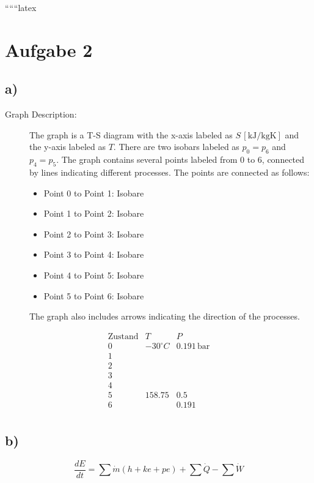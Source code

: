 
``````latex


\section*{Aufgabe 2}

\subsection*{a)}

\begin{description}
    \item[Graph Description:] The graph is a T-S diagram with the x-axis labeled as $S \, [\text{kJ/kgK}]$ and the y-axis labeled as $T$. There are two isobars labeled as $p_0 = p_6$ and $p_4 = p_5$. The graph contains several points labeled from 0 to 6, connected by lines indicating different processes. The points are connected as follows:
    \begin{itemize}
        \item Point 0 to Point 1: Isobare
        \item Point 1 to Point 2: Isobare
        \item Point 2 to Point 3: Isobare
        \item Point 3 to Point 4: Isobare
        \item Point 4 to Point 5: Isobare
        \item Point 5 to Point 6: Isobare
    \end{itemize}
    The graph also includes arrows indicating the direction of the processes.
\end{description}

\[
\begin{array}{c|c|c}
\text{Zustand} & T & P \\
\hline
0 & -30^\circ C & 0.191 \, \text{bar} \\
1 & & \\
2 & & \\
3 & & \\
4 & & \\
5 & 158.75 & 0.5 \\
6 & & 0.191 \\
\end{array}
\]

\subsection*{b)}

\[
\frac{dE}{dt} = \sum \dot{m} (h + ke + pe) + \sum \dot{Q} - \sum \dot{W}
\]

